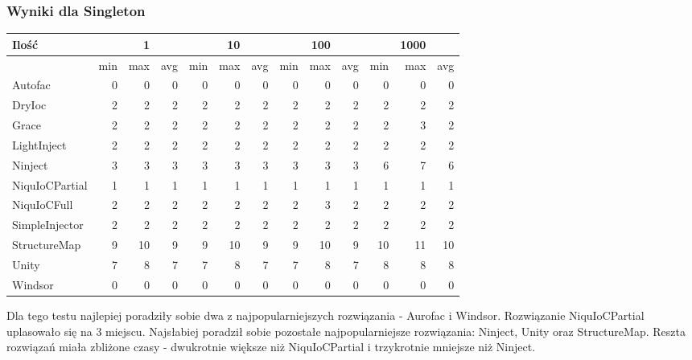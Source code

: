 \documentclass[12pt]{article}
\begin{document}
\subsubsection{Wyniki dla Singleton}
\begin{center}
\begin{small}
	\begin{tabular}{ | l | r r r | r r r | r r r | r r r | }
    		\hline
Ilość & & 1 & & & 10 & & & 100 & & & 1000 & \\ \hline
 & min & max & avg & min & max & avg & min & max & avg & min & max & avg \\ \hline
Autofac & 0 & 0 & 0 & 0 & 0 & 0 & 0 & 0 & 0 & 0 & 0 & 0 \\ \hline
DryIoc & 2 & 2 & 2 & 2 & 2 & 2 & 2 & 2 & 2 & 2 & 2 & 2 \\ \hline
Grace & 2 & 2 & 2 & 2 & 2 & 2 & 2 & 2 & 2 & 2 & 3 & 2 \\ \hline
LightInject & 2 & 2 & 2 & 2 & 2 & 2 & 2 & 2 & 2 & 2 & 2 & 2 \\ \hline
Ninject & 3 & 3 & 3 & 3 & 3 & 3 & 3 & 3 & 3 & 6 & 7 & 6 \\ \hline
NiquIoCPartial & 1 & 1 & 1 & 1 & 1 & 1 & 1 & 1 & 1 & 1 & 1 & 1 \\ \hline
NiquIoCFull & 2 & 2 & 2 & 2 & 2 & 2 & 2 & 3 & 2 & 2 & 2 & 2 \\ \hline
SimpleInjector & 2 & 2 & 2 & 2 & 2 & 2 & 2 & 2 & 2 & 2 & 2 & 2 \\ \hline
StructureMap & 9 & 10 & 9 & 9 & 10 & 9 & 9 & 10 & 9 & 10 & 11 & 10 \\ \hline
Unity & 7 & 8 & 7 & 7 & 8 & 7 & 7 & 8 & 7 & 8 & 8 & 8 \\ \hline
Windsor & 0 & 0 & 0 & 0 & 0 & 0 & 0 & 0 & 0 & 0 & 0 & 0 \\ \hline
  	\end{tabular}
\end{small}
\end{center}
Dla tego testu najlepiej poradziły sobie dwa z najpopularniejszych rozwiązania - Aurofac i Windsor. Rozwiązanie NiquIoCPartial uplasowało się na 3 miejscu. Najsłabiej poradził sobie pozostałe najpopularniejsze rozwiązania: Ninject, Unity oraz StructureMap. Reszta rozwiązań miała zbliżone czasy - dwukrotnie większe niż NiquIoCPartial i trzykrotnie mniejsze niż Ninject.
\end{document}
